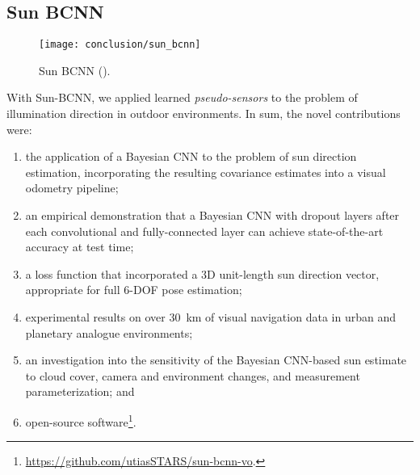 

\subsection{Sun BCNN}

\begin{wrapfigure}{r}{0.3\textwidth}
  \begin{center}
  	\vspace{-20pt}
    \texttt{[image: conclusion/sun\_bcnn]}
     \vspace{-15pt}
  \end{center}
  \caption{Sun BCNN ().}
  \vspace{-5pt}
\end{wrapfigure}


With Sun-BCNN, we applied learned \textit{pseudo-sensors} to the problem of illumination direction in outdoor environments. In sum, the novel contributions were:
\begin{enumerate}
\item the application of a Bayesian CNN to the problem of sun direction estimation, incorporating the resulting covariance estimates into a visual odometry pipeline; 
\item an empirical demonstration that a Bayesian CNN with dropout layers after each convolutional and fully-connected layer can achieve state-of-the-art accuracy at test time;
\item a loss function that incorporated a 3D unit-length sun direction vector, appropriate for full 6-DOF pose estimation;
\item experimental results on over 30~km of visual navigation data in urban \citep{Geiger2012-fq} and planetary analogue \citep{Furgale2012-kk} environments; 
\item an investigation into the sensitivity of the Bayesian CNN-based sun estimate to cloud cover, camera and environment changes, and measurement parameterization; and
\item open-source software\footnote{\url{https://github.com/utiasSTARS/sun-bcnn-vo}.}.
\end{enumerate}

